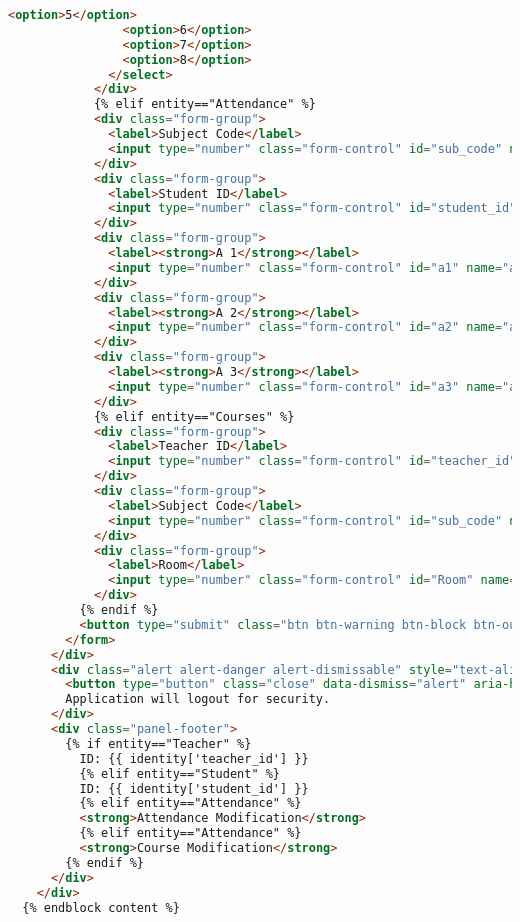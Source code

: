 \begin{lstlisting}[language=HTML]
                <option>5</option>
                <option>6</option>
                <option>7</option>
                <option>8</option>
              </select>
            </div>
            {% elif entity=="Attendance" %}
            <div class="form-group">
              <label>Subject Code</label>
              <input type="number" class="form-control" id="sub_code" name="sub_code" value={{identity.sub_code}}>
            </div>
            <div class="form-group">
              <label>Student ID</label>
              <input type="number" class="form-control" id="student_id" name="student_id" value={{identity.student_id}}>
            </div>
            <div class="form-group">
              <label><strong>A 1</strong></label>
              <input type="number" class="form-control" id="a1" name="a1" value={{identity.a1}}>
            </div>
            <div class="form-group">
              <label><strong>A 2</strong></label>
              <input type="number" class="form-control" id="a2" name="a2" value={{identity.a2}}>
            </div>
            <div class="form-group">
              <label><strong>A 3</strong></label>
              <input type="number" class="form-control" id="a3" name="a3" value={{identity.a3}}>
            </div>
            {% elif entity=="Courses" %}
            <div class="form-group">
              <label>Teacher ID</label>
              <input type="number" class="form-control" id="teacher_id" name="teacher_id" value={{identity.teacher_id}}>
            </div>
            <div class="form-group">
              <label>Subject Code</label>
              <input type="number" class="form-control" id="sub_code" name="sub_code" value={{identity.sub_code}}>
            </div>
            <div class="form-group">
              <label>Room</label>
              <input type="number" class="form-control" id="Room" name="Room" value={{identity.Room}}>
            </div>
          {% endif %}
          <button type="submit" class="btn btn-warning btn-block btn-outline" value="Submit">Submit</button>
        </form>
      </div>
      <div class="alert alert-danger alert-dismissable" style="text-align: center;">
        <button type="button" class="close" data-dismiss="alert" aria-hidden="true">x</button>
        Application will logout for security.
      </div>
      <div class="panel-footer">
        {% if entity=="Teacher" %}
          ID: {{ identity['teacher_id'] }}
          {% elif entity=="Student" %}
          ID: {{ identity['student_id'] }}
          {% elif entity=="Attendance" %}
          <strong>Attendance Modification</strong>
          {% elif entity=="Attendance" %}
          <strong>Course Modification</strong>
        {% endif %}
      </div>
    </div>
  {% endblock content %}
\end{lstlisting}
\pagebreak



